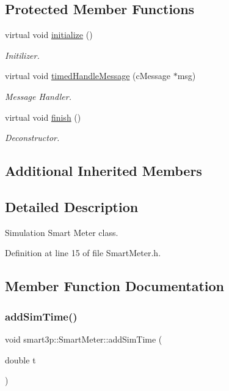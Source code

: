 \subsection*{Protected Member Functions}
\begin{DoxyCompactItemize}
\item 
virtual void \hyperlink{classsmart3p_1_1SmartMeter_a289d547f41c3f011e99bc0eaf5bd945b}{initialize} ()
\begin{DoxyCompactList}\small\item\em Initilizer. \end{DoxyCompactList}\item 
virtual void \hyperlink{classsmart3p_1_1SmartMeter_a3491294618643d423e8fd3578eb3a439}{timed\+Handle\+Message} (c\+Message $\ast$msg)
\begin{DoxyCompactList}\small\item\em Message Handler. \end{DoxyCompactList}\item 
virtual void \hyperlink{classsmart3p_1_1SmartMeter_a315ed406035dff5decd3e0f739893f0b}{finish} ()
\begin{DoxyCompactList}\small\item\em Deconstructor. \end{DoxyCompactList}\end{DoxyCompactItemize}
\subsection*{Additional Inherited Members}


\subsection{Detailed Description}
Simulation Smart Meter class. 

Definition at line 15 of file Smart\+Meter.\+h.



\subsection{Member Function Documentation}
\mbox{\label{classsmart3p_1_1SmartMeter_a3b18ccd6e38a60e4e96d7e6d5b971dbe}} 
\subsubsection{\texorpdfstring{add\+Sim\+Time()}{addSimTime()}}
{\footnotesize\ttfamily void smart3p\+::\+Smart\+Meter\+::add\+Sim\+Time (\begin{DoxyParamCaption}\item[{double}]{t }\end{DoxyParamCaption})}

